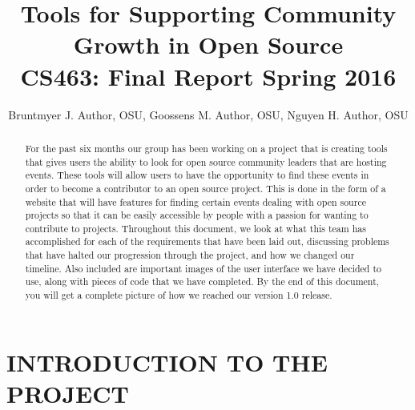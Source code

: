 \documentclass[draftclsnofoot,10pt,onecolumn]{IEEEtran} %
\begin{document}

\title{Tools for Supporting Community Growth in Open Source \\ {\large CS463: Final Report Spring 2016}}

\author{Bruntmyer J. Author, OSU, Goossens M. Author, OSU, Nguyen H. Author, OSU}



\maketitle
\begin{abstract}
For the past six months our group has been working on a project that is creating tools that
gives users the ability to look for open source community leaders that are
hosting events. These tools will allow
users to have the opportunity to find these events in order to become a
contributor to an open source project. This is done in the form of a website that
will have features for finding certain events dealing with open source projects
so that it can be easily accessible by people with a passion for wanting to
contribute to projects. Throughout this document, we look at what this team has
accomplished for each of the requirements that have been laid out, discussing problems
that have halted our progression through the project, and how we changed our timeline.
Also included are important images of the user interface we have decided
to use, along with pieces of code that we have completed. By the end of this document, 
you will get a complete picture of how we
reached our version 1.0 release.
\end{abstract}

\newpage

\tableofcontents

\newpage


\section{INTRODUCTION TO THE PROJECT}
\end{document}
